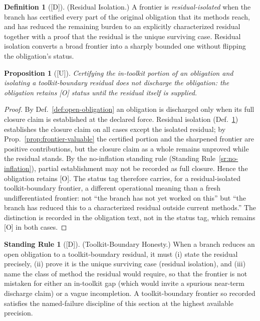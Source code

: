 \documentclass[12pt,oneside]{amsbook}
\theoremstyle{plain}
\newtheorem{proposition}[theorem]{Proposition}
\theoremstyle{definition}
\newtheorem{definition}[theorem]{Definition}
\newtheorem{standingrule}[theorem]{Standing Rule}
\theoremstyle{remark}
\newcommand{\status}[1]{\textup{[#1]}}
\begin{document}
\begin{definition}[\status{D}]\label{def:frontier-residual-isolation}
\textup{(Residual Isolation.)}
A frontier is \emph{residual-isolated} when the branch has certified
every part of the original obligation that its methods reach, and
has reduced the remaining burden to an explicitly characterized
residual together with a proof that the residual is the unique
surviving case.  Residual isolation converts a broad frontier into a
sharply bounded one without flipping the obligation's status.
\end{definition}

\begin{proposition}[\status{U}]\label{prop:toolkit-boundary-no-inflation}
Certifying the in-toolkit portion of an obligation and isolating a
toolkit-boundary residual does not discharge the obligation: the
obligation retains [O] status until the residual itself is supplied.
\end{proposition}

\begin{proof}
By Def.~\ref{def:open-obligation} an obligation is discharged only
when its full closure claim is established at the declared force.
Residual isolation (Def.~\ref{def:frontier-residual-isolation})
establishes the closure claim on all cases except the isolated
residual; by Prop.~\ref{prop:frontier-valuable} the certified
portion and the sharpened frontier are positive contributions, but
the closure claim as a whole remains unproved while the residual
stands.  By the no-inflation standing rule
(Standing Rule~\ref{sr:no-inflation}), partial establishment may
not be recorded as full closure.  Hence the obligation retains [O].
The status tag therefore carries, for a residual-isolated
toolkit-boundary frontier, a different operational meaning than a
fresh undifferentiated frontier: not ``the branch has not yet
worked on this'' but ``the branch has reduced this to a
characterized residual outside current methods.''  The distinction
is recorded in the obligation text, not in the status tag, which
remains [O] in both cases.
\end{proof}

\begin{standingrule}[\status{D}]\label{sr:toolkit-boundary-honesty}
\textup{(Toolkit-Boundary Honesty.)}
When a branch reduces an open obligation to a toolkit-boundary
residual, it must (i) state the residual precisely, (ii) prove it is
the unique surviving case (residual isolation), and (iii) name the
class of method the residual would require, so that the frontier is
not mistaken for either an in-toolkit gap (which would invite a
spurious near-term discharge claim) or a vague incompletion.  A
toolkit-boundary frontier so recorded satisfies the named-failure
discipline of this section at the highest available precision.
\end{standingrule}
\end{document}

